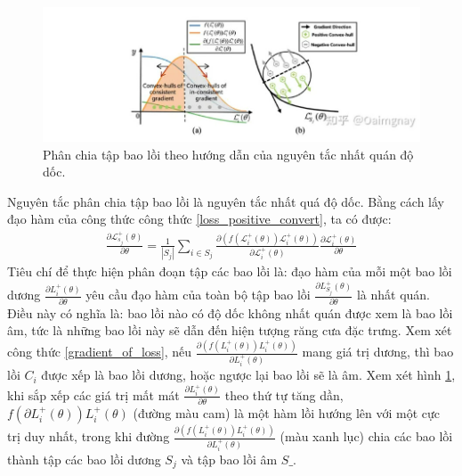 \documentclass[12pt,a4paper,openany,oneside]{report}
\begin{document}
\begin{figure}[ht!]
	\begin{center}
		\includegraphics[width=445px]{./gaussian_gradient.jpg}
		\caption{Phân chia tập bao lồi theo hướng dẫn của nguyên tắc nhất quán độ dốc.}
		\label{gradient_consistentcy_illustration}
	\end{center}
\end{figure} 
Nguyên tắc phân chia tập bao lồi là nguyên tắc nhất quá độ dốc. Bằng cách lấy đạo hàm của công thức công thức \ref{loss_positive_convert}, ta có được:
\begin{align} \label{gradient_of_loss}
	 \frac{\partial \mathcal{L}_{s_j}^{+}(\theta)}{\partial \theta}=\frac{1}{\left|S_j\right|} \sum_{i \in S_j} \frac{\partial\left(f\left(\mathcal{L}_i^{+}(\theta)\right) \mathcal{L}_i^{+}(\theta)\right)}{\partial \mathcal{L}_i^{+}(\theta)} \frac{\partial \mathcal{L}_i^{+}(\theta)}{\partial \theta}
\end{align}
Tiêu chí để thực hiện phân đoạn tập các bao lồi là: đạo hàm của mỗi một bao lồi dương $\frac{\partial L_i^{+}(\theta)}{\partial \theta}$ yêu cầu đạo hàm của toàn bộ tập bao lồi $\frac{\partial L_{S_j}^{+}(\theta)}{\partial \theta}$ là nhất quán. Điều này có nghĩa là: bao lồi nào có độ dốc không nhất quán được xem là bao lồi âm, tức là những bao lồi này sẽ dẫn đến hiện tượng răng cưa đặc trưng. Xem xét công thức \ref{gradient_of_loss}, nếu $\frac{\partial\left(f\left(L_i^{+}(\theta)\right) L_i^{+}(\theta)\right)}{\partial L_i^{+}(\theta)}$ mang giá trị dương, thì bao lồi $C_i$ được xếp là bao lồi dương, hoặc ngược lại bao lồi sẽ là âm. Xem xét hình \ref{gradient_consistentcy_illustration}, khi sắp xếp các giá trị mất mát  $\frac{\partial L_i^{+}(\theta)}{\partial \theta}$ theo thứ tự tăng dần, $f\left(\partial L_i^{+}(\theta)\right) L_i^{+}(\theta)$ (đường màu cam) là một hàm lồi hướng lên với một cực trị duy nhất, trong khi đường  $\frac{\partial\left(f\left(L_i^{+}(\theta)\right) L_i^{+}(\theta)\right)}{\partial L_i^{+}(\theta)}$ (màu xanh lục) chia các bao lồi thành tập các bao lồi dương $S_j$ và tập bao lồi âm $S\_$.
\end{document}
